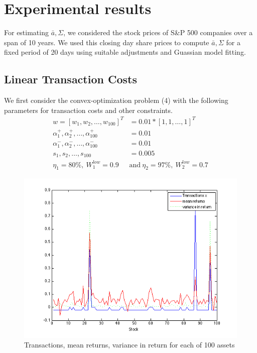 \documentclass[a4paper]{article}
\begin{document}
\section{Experimental results}

For estimating $\bar{a},\Sigma$, we considered the stock prices of S\&P 500 companies over a span of 10 years. We used this closing day share prices to compute $\bar{a},\Sigma$ for a fixed period of 20 days using suitable adjustments and Guassian model fitting. 

\subsection{Linear Transaction Costs}
We first consider the convex-optimization problem (4) with the following parameters for transaction costs and other constraints.
\begin{align*}
w=[w_1,w_2,\ldots,w_{100}]^T&=0.01*[1,1,\ldots,1]^T\\
\alpha_1^+,\alpha_2^+,\ldots,\alpha_{100}^+ &=0.01\\
\alpha_1^-,\alpha_2^-,\ldots,\alpha_{100}^- &= 0.01\\
s_1,s_2,\ldots,s_{100} &=0.005\\
\eta_1 = 80 \%,\  W_1^{low}=0.9 \  &\text{and} \ \eta_2 = 97\%,\  W_2^{low} =0.7
\end{align*}

\begin{figure}
\centering
\includegraphics[width=5in]{stock_vis.png}
\caption{Transactions, mean returns, variance in return for each of 100 assets}
\label{fig:1}
\end{figure}
\end{document}
